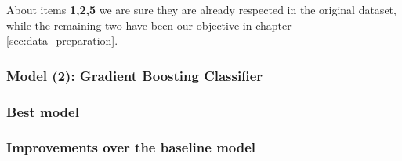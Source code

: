 \documentclass[a4paper,12pt]{article}
\begin{document}
            About items \textbf{1,2,5} we are sure they are already respected in the original dataset, while the remaining two 
            have been our objective in chapter \ref{sec:data_preparation}.


            \subsubsection{Model (2): Gradient Boosting Classifier}

            \subsubsection{Best model}

            \subsubsection{Improvements over the baseline model}



         
    



    

    
    








    

    

    

    




\end{document}
